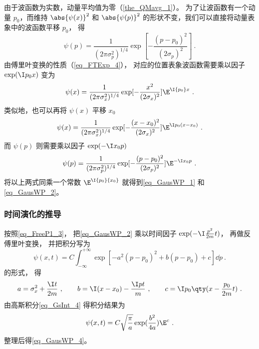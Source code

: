 由于波函数为实数，动量平均值为零（\autoref{the_QMavg_1}）。 为了让波函数有一个动量 $p_0$，而维持 $\abs{\psi(x)}^2$ 和 $\abs{\psi(p)}^2$ %
的形状不变，我们可以直接将动量表象中的波函数平移 $p_0$， 得
\begin{equation}
\psi (p) = \frac{1}{(2\pi\sigma_p^2)^{1/4}} \exp[-\frac{(p - p_0)^2}{(2\sigma_p)^2}]~.
\end{equation}
由傅里叶变换的性质（\autoref{eq_FTExp_4}）， 对应的位置表象波函数需要乘以因子 $\exp(\I p_0 x)$ 变为
\begin{equation}
\psi(x) = \frac{1}{(2\pi\sigma_x^2)^{1/4}} \exp[-\frac{x^2}{(2\sigma_x)^2}] {\E^{\I {p_0}x}}~.
\end{equation}
类似地，也可以再将 $\psi(x)$ 平移 $x_0$ 
\begin{equation}
\psi (x) = \frac{1}{(2\pi\sigma_x^2)^{1/4}} \exp[-\frac{(x-x_0)^2}{(2\sigma_x)^2}] \E^{\I p_0 (x-x_0)}~.
\end{equation}
而 $\psi(p)$ 则需要乘以因子 $\exp (-\I x_0 p)$
\begin{equation}\label{eq_GausWP_3}
\psi(p) = \frac{1}{(2\pi\sigma_p^2)^{1/4}} \exp[-\frac{(p - p_0)^2}{(2\sigma_p)^2}] \E^{-\I x_0 p}~.
\end{equation}
将以上两式同乘一个常数%
 ${\E^{\I{p_0}{x_0}}}$ 就得到\autoref{eq_GausWP_1} 和\autoref{eq_GausWP_2}。

\subsubsection{时间演化的推导}
按照\autoref{eq_FreeP1_3}， 把\autoref{eq_GausWP_2} 乘以时间因子 $\exp(-\I \frac{p^2}{2m}t)$， 再做反傅里叶变换， 并把积分写为
\begin{equation}
\psi(x, t) = C\int_{-\infty}^{+\infty} \exp[-a^2(p-p_0)^2 + b(p-p_0) + c] \dd{p}~.
\end{equation}
的形式， 得
\begin{equation}
a = \sigma_x^2 + \frac{\I t}{2m}~, \qquad
b = \I(x-x_0) - \frac{\I pt}{m}~, \qquad
c = \I p_0 \qty(x - \frac{p_0}{2m} t)~.
\end{equation}
由高斯积分\autoref{eq_GsInt_4}  得积分结果为
\begin{equation}
\psi(x, t) = C\sqrt{\frac{\pi}{a}} \exp(\frac{b^2}{4a})\E^c~.
\end{equation}
整理后得\autoref{eq_GausWP_4}。
